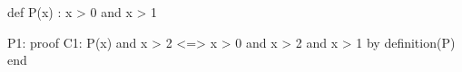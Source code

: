 def P(x) : x > 0 and x > 1

P1: proof
C1:   P(x) and x > 2 <=> x > 0  and x > 2 and x > 1 by definition(P)
end